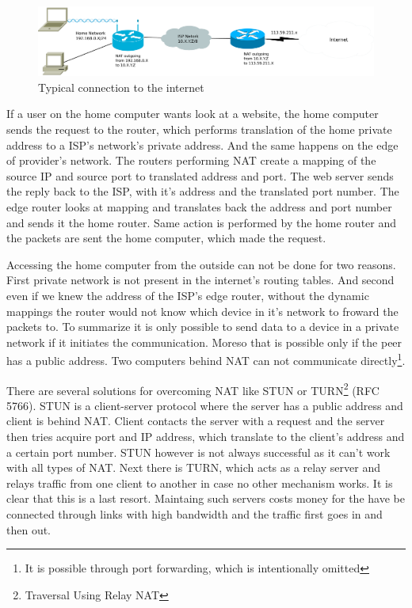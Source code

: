 \begin{figure}[ht]
	\begin{center}
	\includegraphics[width=15cm]{fig/nat-diagram.pdf}
	\caption{Typical connection to the internet}
	\label{fig:nat-diagram}
\end{center}
\end{figure}

If a user on the home computer wants look at a website, the home computer sends the request to the router, which performs translation of the home private address to a ISP's network's private address. And the same happens on the edge of provider's network. The routers performing NAT create a mapping of the source IP and source port to translated address and port. The web server sends the reply back to the ISP, with it's address and the translated port number. The edge router looks at mapping and translates back the address and port number and sends it the home router. Same action is performed by the home router and the packets are sent the home computer, which made the request. 

Accessing the home computer from the outside can not be done for two reasons. First private network is not present in the internet's routing tables. And second even if we knew the address of the ISP's edge router, without the dynamic mappings the router would not know which device in it's network to froward the packets to. To summarize it is only possible to send data to a device in a private network if it initiates the communication. Moreso that is possible only if the peer has a public address. Two computers behind NAT can not communicate directly\footnote{It is possible through port forwarding, which is intentionally omitted}.  

There are several solutions for overcoming NAT like STUN or TURN\footnote{Traversal Using Relay NAT} (RFC 5766). STUN is a client-server protocol where the server has a public address and client is behind NAT. Client contacts the server with a request and the server then tries acquire port and IP address, which translate to the client's address and a certain port number. STUN however is not always successful as it can't work with all types of NAT. Next there is TURN, which acts as a relay server and relays traffic from one client to another in case no other mechanism works. It is clear that this is a last resort. Maintaing such servers costs money for the have be connected through links with high bandwidth and the traffic first goes in and then out.

